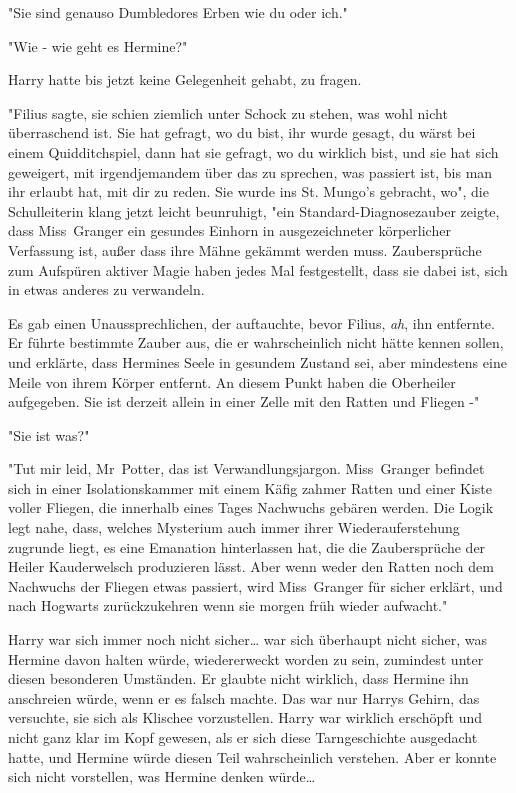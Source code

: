 {"Sie sind genauso Dumbledores Erben wie du oder ich."

"Wie - wie geht es Hermine?"

Harry hatte bis jetzt keine Gelegenheit gehabt, zu fragen.

"Filius sagte, sie schien ziemlich unter Schock zu stehen, was wohl nicht überraschend ist. Sie hat gefragt, wo du bist, ihr wurde gesagt, du wärst bei einem Quidditchspiel, dann hat sie gefragt, wo du wirklich bist, und sie hat sich geweigert, mit irgendjemandem über das zu sprechen, was passiert ist, bis man ihr erlaubt hat, mit dir zu reden. Sie wurde ins St. Mungo's gebracht, wo", die Schulleiterin klang jetzt leicht beunruhigt, "ein Standard-Diagnosezauber zeigte, dass Miss~Granger ein gesundes Einhorn in ausgezeichneter körperlicher Verfassung ist, außer dass ihre Mähne gekämmt werden muss. Zaubersprüche zum Aufspüren aktiver Magie haben jedes Mal festgestellt, dass sie dabei ist, sich in etwas anderes zu verwandeln.

Es gab einen Unaussprechlichen, der auftauchte, bevor Filius, \emph{ah}, ihn entfernte. Er führte bestimmte Zauber aus, die er wahrscheinlich nicht hätte kennen sollen, und erklärte, dass Hermines Seele in gesundem Zustand sei, aber mindestens eine Meile von ihrem Körper entfernt. An diesem Punkt haben die Oberheiler aufgegeben. Sie ist derzeit allein in einer Zelle mit den Ratten und Fliegen -"

"Sie ist was?"

"Tut mir leid, Mr~Potter, das ist Verwandlungsjargon. Miss~Granger befindet sich in einer Isolationskammer mit einem Käfig zahmer Ratten und einer Kiste voller Fliegen, die innerhalb eines Tages Nachwuchs gebären werden. Die Logik legt nahe, dass, welches Mysterium auch immer ihrer Wiederauferstehung zugrunde liegt, es eine Emanation hinterlassen hat, die die Zaubersprüche der Heiler Kauderwelsch produzieren lässt. Aber wenn weder den Ratten noch dem Nachwuchs der Fliegen etwas passiert, wird Miss~Granger für sicher erklärt, und nach Hogwarts zurückzukehren wenn sie morgen früh wieder aufwacht."

Harry war sich immer noch nicht sicher… war sich überhaupt nicht sicher, was Hermine davon halten würde, wiedererweckt worden zu sein, zumindest unter diesen besonderen Umständen. Er glaubte nicht wirklich, dass Hermine ihn anschreien würde, wenn er es falsch machte. Das war nur Harrys Gehirn, das versuchte, sie sich als Klischee vorzustellen. Harry war wirklich erschöpft und nicht ganz klar im Kopf gewesen, als er sich diese Tarngeschichte ausgedacht hatte, und Hermine würde diesen Teil wahrscheinlich verstehen. Aber er konnte sich nicht vorstellen, was Hermine denken würde…

}
